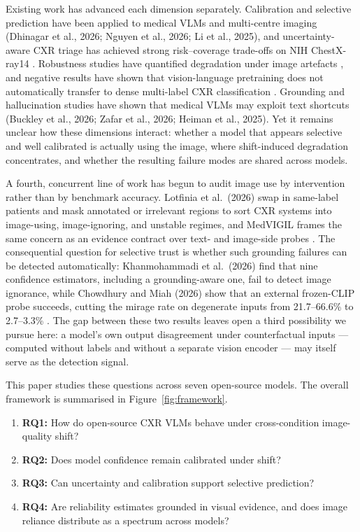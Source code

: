 Existing work has advanced each dimension separately. Calibration and selective prediction have been applied to medical VLMs and multi-centre imaging (Dhinagar et al., 2026; Nguyen et al., 2026; Li et al., 2025), and uncertainty-aware CXR triage has achieved strong risk--coverage trade-offs on NIH ChestX-ray14 \citep{li2025atcxr}. Robustness studies have quantified degradation under image artefacts \citep{cheng2025robustness}, and negative results have shown that vision-language pretraining does not automatically transfer to dense multi-label CXR classification \citep{fisher2025negative}. Grounding and hallucination studies have shown that medical VLMs may exploit text shortcuts (Buckley et al., 2026; Zafar et al., 2026; Heiman et al., 2025). Yet it remains unclear how these dimensions interact: whether a model that appears selective and well calibrated is actually using the image, where shift-induced degradation concentrates, and whether the resulting failure modes are shared across models.

A fourth, concurrent line of work has begun to audit image use by intervention rather than by benchmark accuracy. Lotfinia et al.\ (2026) swap in same-label patients and mask annotated or irrelevant regions to sort CXR systems into image-using, image-ignoring, and unstable regimes, and MedVIGIL frames the same concern as an evidence contract over text- and image-side probes \citep{lotfinia2026image,jiang2026medvigil}. The consequential question for selective trust is whether such grounding failures can be detected automatically: Khanmohammadi et al.\ (2026) find that nine confidence estimators, including a grounding-aware one, fail to detect image ignorance, while Chowdhury and Miah (2026) show that an external frozen-CLIP probe succeeds, cutting the mirage rate on degenerate inputs from 21.7--66.6\% to 2.7--3.3\% \citep{khanmohammadi2026calibrated,chowdhury2026mirage}. The gap between these two results leaves open a third possibility we pursue here: a model's own output disagreement under counterfactual inputs --- computed without labels and without a separate vision encoder --- may itself serve as the detection signal.

This paper studies these questions across seven open-source models. The overall framework is summarised in Figure~\ref{fig:framework}.

\begin{enumerate}
\item \textbf{RQ1:} How do open-source CXR VLMs behave under cross-condition image-quality shift?
\item \textbf{RQ2:} Does model confidence remain calibrated under shift?
\item \textbf{RQ3:} Can uncertainty and calibration support selective prediction?
\item \textbf{RQ4:} Are reliability estimates grounded in visual evidence, and does image reliance distribute as a spectrum across models?
\end{enumerate}

